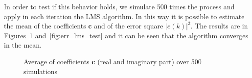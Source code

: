 \documentclass[10pt]{article}
\numberwithin{equation}{section}
\begin{document}
In order to test if this behavior holds, we simulate 500 times the process and apply in each iteration the LMS algorithm. In this way it is possible to estimate the mean of the coefficients $\mathbf{c}$ and of the error square $|e(k)|^2$. The results are in Figures~\ref{fig:coeff_lms_test} and~\ref{fig:err_lms_test} and it can be seen that the algorithm converges in the mean.

\begin{figure}[h!]
\centering
 	 \caption{Average of coefficients $\mathbf{c}$ (real and imaginary part) over 500 simulations}
  \label{fig:coeff_lms_test}
\end{figure}
\end{document}
